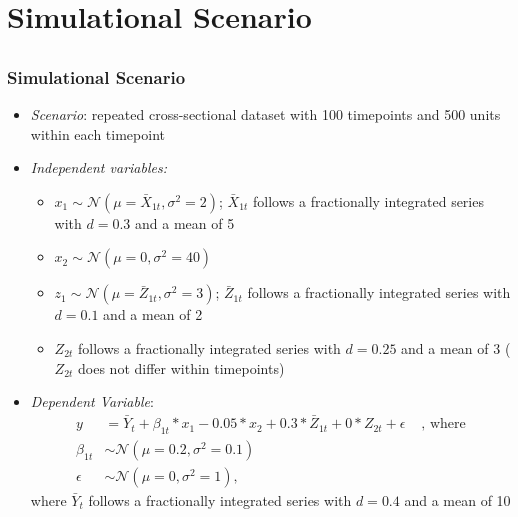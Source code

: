 \documentclass{beamer}\usepackage[]{graphicx}\usepackage[]{color}
\begin{document}
\section{Simulational Scenario}
\subsection{}
\begin{frame}%
\frametitle{Simulational Scenario}


\begin{itemize}
\item \emph{Scenario}: repeated cross-sectional dataset with 100 timepoints and 500 units within each timepoint
\item \emph{Independent variables:}
\begin{itemize}
\item $x_1 \sim \mathcal{N}(\mu=\bar{X}_{1t},\sigma^2=2)$; $\bar{X}_{1t}$ follows a fractionally integrated series with $d=0.3$ and a mean of 5
\item $x_2 \sim \mathcal{N}(\mu=0,\sigma^2=40)$
\item $z_1 \sim \mathcal{N}(\mu=\bar{Z}_{1t},\sigma^2=3)$; $\bar{Z}_{1t}$ follows a fractionally integrated series with $d=0.1$ and a mean of 2
\item $Z_{2t}$ follows a fractionally integrated series with $d=0.25$ and a mean of 3 ($Z_{2t}$ does not differ within timepoints)
\end{itemize}
\item \emph{Dependent Variable}:
\begin{align*}
y &=\bar{Y}_t+\beta_{1t} * x_1 - 0.05 * x_2 + 0.3 * \bar{Z}_{1t} + 0 * Z_{2t} + \epsilon &\text{ , where} \nonumber \\
\beta_{1t} &\sim \mathcal{N}(\mu=0.2,\sigma^2=0.1) & \nonumber \\
\epsilon &\sim \mathcal{N}(\mu=0,\sigma^2=1), &
\end{align*}
\footnotesize{where $\bar{Y}_t$ follows a fractionally integrated series with $d=0.4$ and a mean of 10}
\end{itemize}
\end{frame}
\end{document}
